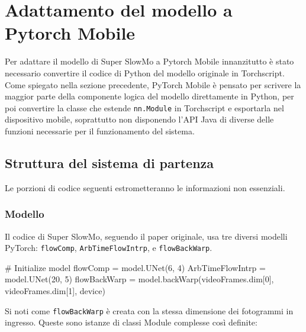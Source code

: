 \FloatBarrier

\section{Adattamento del modello a Pytorch Mobile}

Per adattare il modello di Super SlowMo a Pytorch Mobile innanzitutto è 
stato necessario convertire il codice di Python del modello originale in
Torchscript. Come spiegato nella sezione precedente, PyTorch Mobile è pensato
per scrivere la maggior parte della componente logica del modello direttamente in Python, 
per poi convertire la classe che estende \texttt{nn.Module} in Torchscript e esportarla nel
dispositivo mobile, soprattutto non disponendo l'API Java di diverse delle funzioni necessarie
per il funzionamento del sistema. 

\subsection{Struttura del sistema di partenza}

Le porzioni di codice seguenti estrometteranno le informazioni non essenziali.

\subsubsection*{Modello}

Il codice di Super SlowMo, seguendo il paper originale, usa tre diversi modelli PyTorch: 
\texttt{flowComp}, \texttt{ArbTimeFlowIntrp}, e \texttt{flowBackWarp}.

\begin{Python}
# Initialize model
flowComp = model.UNet(6, 4)
ArbTimeFlowIntrp = model.UNet(20, 5)
flowBackWarp = model.backWarp(videoFrames.dim[0], videoFrames.dim[1], device)
\end{Python}

Si noti come \texttt{flowBackWarp} è creata con la stessa dimensione dei fotogrammi in 
ingresso. Queste sono istanze di classi Module complesse così definite:

